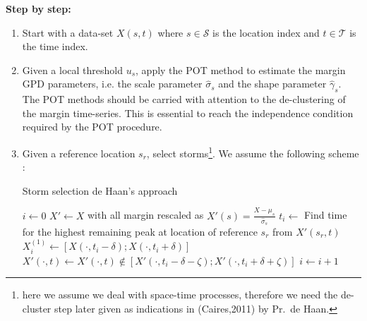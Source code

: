 {\bfseries Step by step:}
\begin{enumerate}
\item Start with a data-set $X(s,t)$ where $s \in \mathcal{S}$ is the location index and $t \in \mathcal{T}$ is the time index.
\item Given a local threshold $u_s$, apply the POT method to estimate the margin GPD parameters, i.e. the scale parameter $\hat{\sigma}_s$ and the shape parameter $\hat{\gamma}_s$. {\color{red} The POT methods should be carried with attention to the de-clustering of the margin time-series. This is essential to reach the independence condition required by the POT procedure}.
\item Given a reference location $s_r$, select storms\footnote{here we assume we deal with space-time processes, therefore we need the de-cluster step later given as indications in (Caires,2011) by Pr.~de Haan.}. We assume the following scheme : 
\begin{algorithm}
	\caption{Storm selection de Haan's approach}
	\label{algo-stormselection-dehaan}
	\begin{algorithmic}
	\State $i \gets 0$
	\State $X' \gets X$ with all margin rescaled as $X'(s) = \frac{X-\mu_{s}}{\hat{\sigma}_{s}}$
	\State $t_i \gets$ Find time for the highest remaining peak at location of reference $s_r$ from $X'(s_r,t)$
	\State $X^{(1)}_i \gets [X(\cdotp,t_i-\delta); X(\cdotp,t_i+\delta) ]$
	\State $X'(\cdotp,t) \gets X'(\cdotp,t) \notin \left[ X'(\cdotp,t_i-\delta-\zeta); X'(\cdotp,t_i+\delta+\zeta) \right] $ 
	\State $i \gets i+1$
	\EndWhile
	\end{algorithmic}
\end{algorithm}


\end{enumerate}
